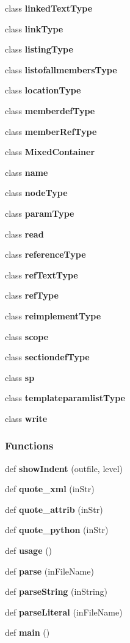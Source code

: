 \begin{DoxyCompactItemize}
class {\bf linked\+Text\+Type}
\item 
class {\bf link\+Type}
\item 
class {\bf listing\+Type}
\item 
class {\bf listofallmembers\+Type}
\item 
class {\bf location\+Type}
\item 
class {\bf memberdef\+Type}
\item 
class {\bf member\+Ref\+Type}
\item 
class {\bf Mixed\+Container}
\item 
class {\bf name}
\item 
class {\bf node\+Type}
\item 
class {\bf param\+Type}
\item 
class {\bf read}
\item 
class {\bf reference\+Type}
\item 
class {\bf ref\+Text\+Type}
\item 
class {\bf ref\+Type}
\item 
class {\bf reimplement\+Type}
\item 
class {\bf scope}
\item 
class {\bf sectiondef\+Type}
\item 
class {\bf sp}
\item 
class {\bf templateparamlist\+Type}
\item 
class {\bf write}
\end{DoxyCompactItemize}
\subsubsection*{Functions}
\begin{DoxyCompactItemize}
\item 
def {\bf show\+Indent} (outfile, level)
\item 
def {\bf quote\+\_\+xml} (in\+Str)
\item 
def {\bf quote\+\_\+attrib} (in\+Str)
\item 
def {\bf quote\+\_\+python} (in\+Str)
\item 
def {\bf usage} ()
\item 
def {\bf parse} (in\+File\+Name)
\item 
def {\bf parse\+String} (in\+String)
\item 
def {\bf parse\+Literal} (in\+File\+Name)
\item 
def {\bf main} ()
\end{DoxyCompactItemize}
